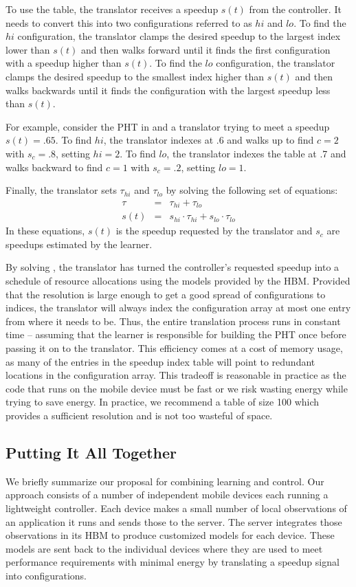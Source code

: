 To use the table, the translator receives a speedup $s(t)$ from the
controller.  It needs to convert this into two configurations referred
to as $hi$ and $lo$.  To find the $hi$ configuration, the translator
clamps the desired speedup to the largest index lower than $s(t)$ and
then walks forward until it finds the first configuration with a
speedup higher than $s(t)$.  To find the $lo$ configuration, the
translator clamps the desired speedup to the smallest index higher
than $s(t)$ and then walks backwards until it finds the configuration
with the largest speedup less than $s(t)$.

For example, consider the PHT in  and a translator trying
to meet a speedup $s(t) = .65$.  To find $hi$, the translator indexes
at .6 and walks up to find $c=2$ with $s_c=.8$, setting $hi = 2$.  To
find $lo$, the translator indexes the table at .7 and walks backward
to find $c=1$ with $s_c=.2$, setting $lo = 1$.

Finally, the translator sets $\tau_{hi}$ and $\tau_{lo}$ by solving
the following set of equations:
\begin{eqnarray}
  \tau &=& \tau_{hi} + \tau_{lo}    \label{eqn:s1} \\
  s(t) &=& s_{hi} \cdot \tau_{hi} + s_{lo} \cdot \tau_{lo} \label{eqn:s2} 
\end{eqnarray}
In these equations, $s(t)$ is the speedup requested by the translator
and $s_c$ are speedups estimated by the learner.

By solving , the translator has turned the
controller's requested speedup into a schedule of resource allocations
using the models provided by the HBM.  Provided that the resolution is
large enough to get a good spread of configurations to indices, the
translator will always index the configuration array at most one entry
from where it needs to be.  Thus, the entire translation process runs
in constant time -- assuming that the learner is responsible for
building the PHT once before passing it on to the translator.  This
efficiency comes at a cost of memory usage, as many of the entries in
the speedup index table will point to redundant locations in the
configuration array.  This tradeoff is reasonable in practice as the
code that runs on the mobile device must be fast or we risk wasting
energy while trying to save energy.  In practice, we recommend a table
of size 100 which provides a sufficient resolution and is not too
wasteful of space.


\subsection{Putting It All Together}
We briefly summarize our proposal for combining learning and control.
Our approach consists of a number of independent mobile devices each
running a lightweight controller.  Each device makes a small number of
local observations of an application it runs and sends those to the
server.  The server integrates those observations in its HBM to
produce customized models for each device.  These models are sent back
to the individual devices where they are used to meet performance
requirements with minimal energy by translating a speedup signal into
configurations.

